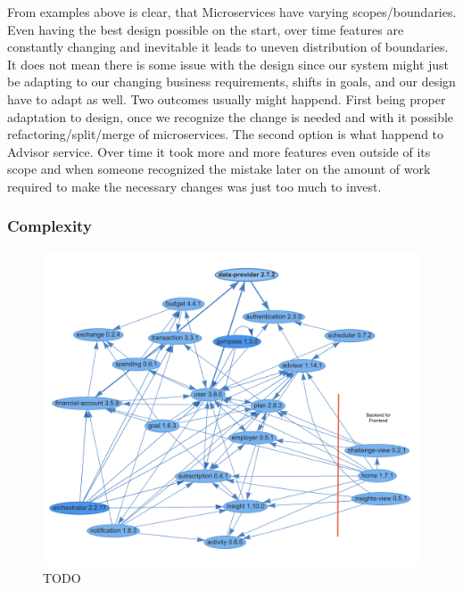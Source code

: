 From examples above is clear, that Microservices have varying scopes/boundaries. Even having the best design possible on the start, over time features are constantly changing and inevitable it leads to uneven distribution of boundaries. It does not mean there is some issue with the design since our system might just be adapting to our changing business requirements, shifts in goals, and our design have to adapt as well. Two outcomes usually might happend. First being proper adaptation to design, once we recognize the change is needed and with it possible refactoring/split/merge of microservices. The second option is what happend to Advisor service. Over time it took more and more features even outside of its scope and when someone recognized the mistake later on the amount of work required to make the necessary changes was just too much to invest.

\subsubsection{Complexity}
\begin{figure}
    \centering
    \includegraphics[width=\textwidth]{images/microservices-current-commented.png}
    \caption{TODO \label{img:microservices-current-commented}}
\end{figure}
